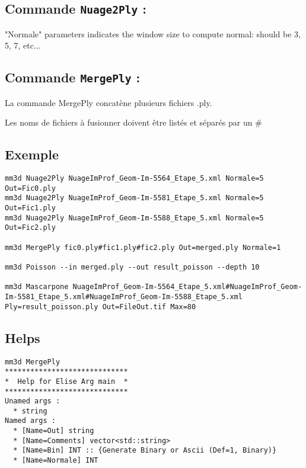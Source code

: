 \subsection{Commande {\tt Nuage2Ply} :}

"Normale" parameters indicates the window size to compute normal: should be 3, 5, 7, etc...

\subsection{Commande {\tt MergePly} :}

La commande MergePly concat\`ene plusieurs fichiers .ply.

Les noms de fichiers \`a fusionner doivent \^etre list\'es et s\'epar\'es par un \#

\subsection{Exemple}

\begin{verbatim} 
mm3d Nuage2Ply NuageImProf_Geom-Im-5564_Etape_5.xml Normale=5 Out=Fic0.ply
mm3d Nuage2Ply NuageImProf_Geom-Im-5581_Etape_5.xml Normale=5 Out=Fic1.ply
mm3d Nuage2Ply NuageImProf_Geom-Im-5588_Etape_5.xml Normale=5 Out=Fic2.ply

mm3d MergePly fic0.ply#fic1.ply#fic2.ply Out=merged.ply Normale=1

mm3d Poisson --in merged.ply --out result_poisson --depth 10				 	 

mm3d Mascarpone NuageImProf_Geom-Im-5564_Etape_5.xml#NuageImProf_Geom-Im-5581_Etape_5.xml#NuageImProf_Geom-Im-5588_Etape_5.xml 
Ply=result_poisson.ply Out=FileOut.tif Max=80
\end{verbatim} 

\subsection{Helps}

\begin{verbatim}   
mm3d MergePly
*****************************
*  Help for Elise Arg main  *
*****************************
Unamed args :
  * string
Named args :
  * [Name=Out] string
  * [Name=Comments] vector<std::string>
  * [Name=Bin] INT :: {Generate Binary or Ascii (Def=1, Binary)}
  * [Name=Normale] INT
\end{verbatim}
  
